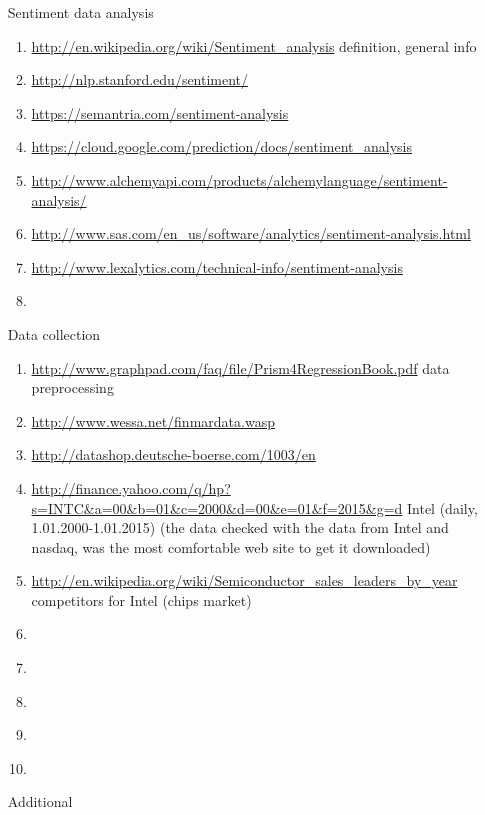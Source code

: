 \documentclass{article}
\begin{document}
\begin{enumerate}
	\item[Sentiment data analysis]
	\begin{enumerate}
		\item \textcolor{red}{\url{http://en.wikipedia.org/wiki/Sentiment_analysis}} definition, general info
		\item \textcolor{blue}{\url{http://nlp.stanford.edu/sentiment/}}
		\item \textcolor{black}{\url{https://semantria.com/sentiment-analysis}}
		\item \textcolor{black}{\url{https://cloud.google.com/prediction/docs/sentiment_analysis}}
		\item \textcolor{black}{\url{http://www.alchemyapi.com/products/alchemylanguage/sentiment-analysis/}}
		\item \textcolor{black}{\url{http://www.sas.com/en_us/software/analytics/sentiment-analysis.html}}
		\item \textcolor{black}{\url{http://www.lexalytics.com/technical-info/sentiment-analysis}}
		\item \textcolor{black}{\url{}}
	\end{enumerate}
	\item[Data collection]
		\begin{enumerate}
			\item \textcolor{red}{\url{http://www.graphpad.com/faq/file/Prism4RegressionBook.pdf}} data preprocessing
			\item \textcolor{black}{\url{http://www.wessa.net/finmardata.wasp}}
			\item \textcolor{black}{\url{http://datashop.deutsche-boerse.com/1003/en}}
			\item \textcolor{red}{\url{http://finance.yahoo.com/q/hp?s=INTC&a=00&b=01&c=2000&d=00&e=01&f=2015&g=d}} Intel (daily, 1.01.2000-1.01.2015) (the data checked with the data from Intel and nasdaq, was the most comfortable web site to get it downloaded)
			\item \textcolor{red}{\url{http://en.wikipedia.org/wiki/Semiconductor_sales_leaders_by_year}} competitors for Intel (chips market)
			\item \textcolor{black}{\url{}}
			\item \textcolor{black}{\url{}}
			\item \textcolor{black}{\url{}}
			\item \textcolor{black}{\url{}}
			\item \textcolor{black}{\url{}}
		\end{enumerate}
	\item[Additional]

\end{enumerate}
\end{document}
